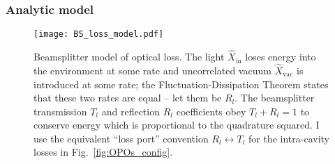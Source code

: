 
\subsubsection{Analytic model}
\label{sec:dOPO_model}

\begin{figure}
	\centering
	\texttt{[image: BS\_loss\_model.pdf]}
	\caption{Beamsplitter model of optical loss. The light $\hat X_\text{in}$ loses energy into the environment at some rate and uncorrelated vacuum $\hat X_\text{vac}$ is introduced at some rate; the Fluctuation-Dissipation Theorem states that these two rates are equal -- let them be $R_l$. The beamsplitter transmission $T_l$ and reflection $R_l$ coefficients obey $T_l+R_l=1$ to conserve energy which is proportional to the quadrature squared. I use the equivalent ``loss port'' convention $R_l\leftrightarrow T_l$ for the intra-cavity losses in Fig.~\ref{fig:OPOs_config}.}
	\label{fig:beamsplitter_loss}
\end{figure}



